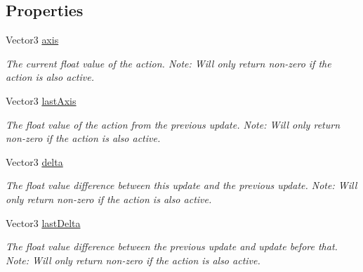 \subsection*{Properties}
\begin{DoxyCompactItemize}
\item 
Vector3 \mbox{\hyperlink{interface_valve_1_1_v_r_1_1_i_steam_v_r___action___vector3_ac416c306f1f927af2ab01c882839a8ce}{axis}}
\begin{DoxyCompactList}\small\item\em The current float value of the action. Note\+: Will only return non-\/zero if the action is also active. \end{DoxyCompactList}\item 
Vector3 \mbox{\hyperlink{interface_valve_1_1_v_r_1_1_i_steam_v_r___action___vector3_a9d3a8788967b30126be9b9482c4ded5f}{last\+Axis}}
\begin{DoxyCompactList}\small\item\em The float value of the action from the previous update. Note\+: Will only return non-\/zero if the action is also active. \end{DoxyCompactList}\item 
Vector3 \mbox{\hyperlink{interface_valve_1_1_v_r_1_1_i_steam_v_r___action___vector3_af6c10a846e313a404940b46a776265bb}{delta}}
\begin{DoxyCompactList}\small\item\em The float value difference between this update and the previous update. Note\+: Will only return non-\/zero if the action is also active. \end{DoxyCompactList}\item 
Vector3 \mbox{\hyperlink{interface_valve_1_1_v_r_1_1_i_steam_v_r___action___vector3_a27dfb00ae648ac06a9c7c8510a6dcf25}{last\+Delta}}
\begin{DoxyCompactList}\small\item\em The float value difference between the previous update and update before that. Note\+: Will only return non-\/zero if the action is also active. \end{DoxyCompactList}\end{DoxyCompactItemize}


